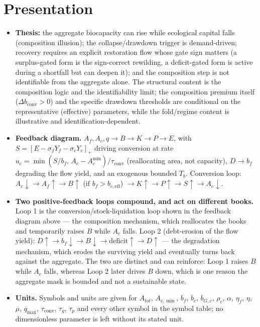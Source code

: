 \documentclass[11pt]{article}
\begin{document}
\section{Presentation}

\begin{itemize}
\item \textbf{Thesis:} the aggregate biocapacity can rise while ecological capital falls (composition illusion); the collapse/drawdown trigger is demand-driven; recovery requires an explicit restoration flow whose gate sign matters (a surplus-gated form is the sign-correct rewilding, a deficit-gated form is active during a shortfall but can deepen it); and the composition step is not identifiable from the aggregate alone. The structural content is the composition logic and the identifiability limit; the composition premium itself ($\Delta b_{\mathrm{conv}}>0$) and the specific drawdown thresholds are conditional on the representative (effective) parameters, while the fold/regime content is illustrative and identification-dependent.
\item \textbf{Feedback diagram.} $A_f,A_c,q\to B\to K\to P\to E$, with $S=[E-\sigma_fY_f-\sigma_cY_c]_+$ driving conversion at rate $u_c=\min(S/b_f,\,A_c-A_c^{\min})/\tau_{\mathrm{conv}}$ (reallocating area, not capacity), $D\to b_f$ degrading the flow yield, and an exogenous bounded $T_b$. Conversion loop: $A_c\!\downarrow\!\to A_f\!\uparrow\!\to B\!\uparrow\!$ (if $b_f>b_{c,\mathrm{eff}}$) $\!\to\!K\!\uparrow\!\to\!P\!\uparrow\!\to\!S\!\uparrow\!\to\!A_c\!\downarrow$.
\item \textbf{Two positive-feedback loops compound, and act on different books.} Loop 1 is the conversion/stock-liquidation loop shown in the feedback diagram above --- the composition mechanism, which reallocates the books and temporarily raises $B$ while $A_c$ falls. Loop 2 (debt-erosion of the flow yield): $D\!\uparrow\!\to b_f\!\downarrow\!\to B\!\downarrow\!\to\mathrm{deficit}\!\uparrow\!\to D\!\uparrow$ --- the degradation mechanism, which erodes the surviving yield and eventually turns back against the aggregate. The two are distinct and can reinforce: Loop 1 raises $B$ while $A_c$ falls, whereas Loop 2 later drives $B$ down, which is one reason the aggregate mask is bounded and not a sustainable state.
\item \textbf{Units.} Symbols and units are given for $A_{tot}$, $A_{c,\min}$, $b_f$, $b_c$, $b_{G,c}$, $\rho_c$, $\alpha$, $\eta_f$, $\eta$, $\mu$, $q_{\max}$, $\tau_{\mathrm{conv}}$, $\tau_g$, $\tau_p$ and every other symbol in the symbol table; no dimensionless parameter is left without its stated unit.

\end{itemize}
\end{document}
